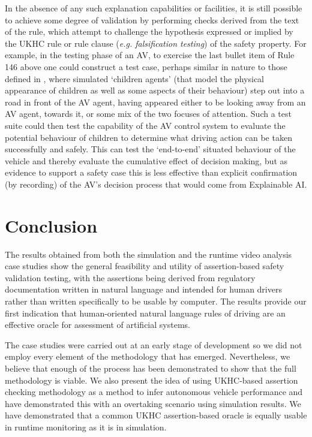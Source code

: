 In the absence of any such explanation capabilities or facilities, it is still possible to achieve some degree of validation by performing checks derived from the text of the rule, which attempt to challenge the hypothesis expressed or implied by the UKHC rule or rule clause (\emph{e.g. falsification testing}) of the safety property. For example, in the testing phase of an AV, to exercise the last bullet item of Rule 146 above one could construct a test case, perhaps similar in nature to those defined in \cite{EuroNCAP}, where simulated `children agents' (that model the physical appearance of children as well as some aspects of their behaviour) step out into a road in front of the AV agent, having appeared either to be looking away from an AV agent, towards it, or some mix of the two focuses of attention. Such a test suite could then test the capability of the AV control system to evaluate the potential behaviour of children to determine what driving action can be taken successfully and safely. This can test the `end-to-end' situated behaviour of the vehicle and thereby evaluate the cumulative effect of decision making, but as evidence to support a safety case this is less effective than explicit confirmation (by recording) of the AV's decision process that would come from Explainable AI.

\section{Conclusion}\label{conclusion}
The results obtained from both the simulation and the runtime video analysis case studies show the general feasibility and utility of assertion-based safety validation testing, with the assertions being derived from regulatory documentation written in natural language and intended for human drivers rather than written specifically to be usable by computer. The results provide our first indication that human-oriented natural language rules of driving are an effective oracle for assessment of artificial systems.

The case studies were carried out at an early stage of development so we did not employ every element of the methodology that has emerged. Nevertheless, we believe that enough of the process has been demonstrated to show that the full methodology is viable. We also present the idea of using UKHC-based assertion checking methodology as a method to infer autonomous vehicle performance and have demonstrated this with an overtaking scenario using simulation results. We have demonstrated that a common UKHC assertion-based oracle is equally usable in runtime monitoring as it is in simulation.


